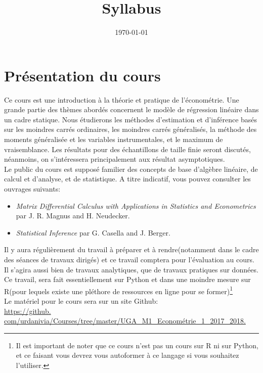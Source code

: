
\title{Syllabus}
\date{\today}

\maketitle
\section*{ Présentation du cours}
Ce cours est une introduction  à la théorie et pratique de l'économétrie. Une grande partie des thèmes abordés concernent le modèle de régression linéaire dans un cadre statique. Nous étudierons les méthodes d'estimation et d'inférence basés sur les moindres carrés ordinaires, les moindres carrés généralisés, la méthode des moments généralisée et les variables instrumentales, et le maximum de vraisemblance. Les résultats pour des échantillons de taille finie seront discutés, néanmoins, on s'intéressera principalement aux résultat asymptotiques.\\
Le public du cours est supposé familier des concepts de base d'algèbre linéaire, de calcul et d'analyse, et de statistique. A titre indicatif, vous pouvez consulter les ouvrages suivants:
\begin{itemize}
\item \emph{Matrix Differential Calculus with Applications in Statistics and Econometrics} par J. R. Magnus and H. Neudecker.
\item \emph{Statistical Inference} par  G. Casella and J. Berger.
\end{itemize}
Il y aura régulièrement du travail à préparer et à rendre(notamment
dans le cadre des séances de travaux dirigés) et ce travail comptera
pour l'évaluation au cours. Il s'agira aussi bien de travaux
analytiques, que de travaux pratiques sur données. Ce travail,
sera fait essentiellement sur Python et dans une moindre mesure sur R(pour lequels existe une pléthore de ressources en
ligne pour se former)\footnote{Il est important de noter que ce cours
  n'est pas un cours sur R ni sur Python, et ce faisant vous devrez vous autoformer à ce langage si vous souhaitez l'utiliser.}
\\
Le matériel pour le cours sera sur un site Github:\\
\url{ https://github. com/urdanivia/Courses/tree/master/UGA_M1_Econométrie_1_2017_2018.}
